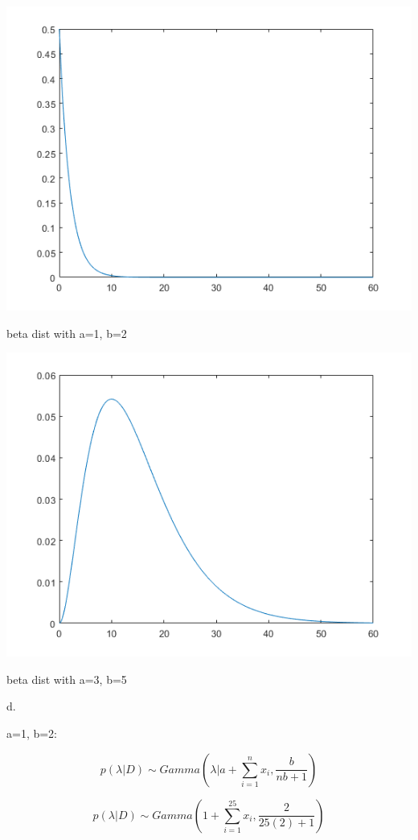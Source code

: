 \documentclass[a4paper]{article}
\begin{document}
\begin{center}
    \includegraphics[scale=1]{2c-1.png}
    \caption{beta dist with a=1, b=2}
\end{center}

\begin{center}
    \includegraphics[scale=1]{2c-2.png}
    \caption{beta dist with a=3, b=5}
\end{center}

\noindent
d.

\noindent
a=1, b=2:

$$p(\lambda|D)\sim Gamma(\lambda |a+\sum_{i=1}^{n}x_i, \frac{b}{nb+1})$$

$$p(\lambda|D)\sim Gamma(1+\sum_{i=1}^{25}x_i, \frac{2}{25(2)+1})$$
\end{document}
